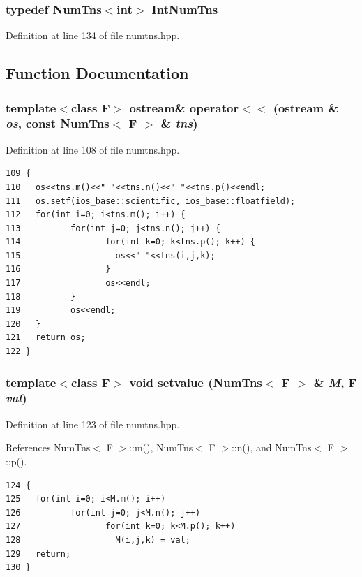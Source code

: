 \subsubsection{\setlength{\rightskip}{0pt plus 5cm}typedef {\bf Num\-Tns}$<$int$>$ {\bf Int\-Num\-Tns}}\label{numtns_8hpp_3fd20cf7fb822b904b7d9fb6780314b4_3fd20cf7fb822b904b7d9fb6780314b4}




Definition at line 134 of file numtns.hpp.

\subsection{Function Documentation}
\subsubsection{\setlength{\rightskip}{0pt plus 5cm}template$<$class F$>$ ostream\& operator$<$$<$ (ostream \& {\em os}, const {\bf Num\-Tns}$<$ F $>$ \& {\em tns})\hspace{0.3cm}{\tt  [inline]}}\label{numtns_8hpp_3f4dfa10f880705e98a019bd36a429c8_3f4dfa10f880705e98a019bd36a429c8}




Definition at line 108 of file numtns.hpp.

\footnotesize\begin{verbatim}109 {
110   os<<tns.m()<<" "<<tns.n()<<" "<<tns.p()<<endl;
111   os.setf(ios_base::scientific, ios_base::floatfield);
112   for(int i=0; i<tns.m(); i++) {
113          for(int j=0; j<tns.n(); j++) {
114                 for(int k=0; k<tns.p(); k++) {
115                   os<<" "<<tns(i,j,k);
116                 }
117                 os<<endl;
118          }
119          os<<endl;
120   }
121   return os;
122 }
\end{verbatim}\normalsize 


\subsubsection{\setlength{\rightskip}{0pt plus 5cm}template$<$class F$>$ void setvalue ({\bf Num\-Tns}$<$ F $>$ \& {\em M}, F {\em val})\hspace{0.3cm}{\tt  [inline]}}\label{numtns_8hpp_2439c0632cd09b692177b3320104d4b2_2439c0632cd09b692177b3320104d4b2}




Definition at line 123 of file numtns.hpp.

References Num\-Tns$<$ F $>$::m(), Num\-Tns$<$ F $>$::n(), and Num\-Tns$<$ F $>$::p().

\footnotesize\begin{verbatim}124 {
125   for(int i=0; i<M.m(); i++)
126          for(int j=0; j<M.n(); j++)
127                 for(int k=0; k<M.p(); k++)
128                   M(i,j,k) = val;
129   return;
130 }
\end{verbatim}\normalsize 


